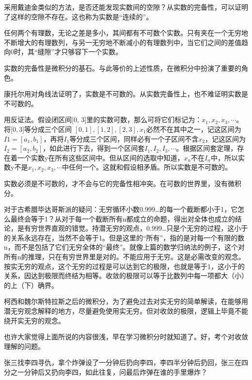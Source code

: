 \songti
\setlength{\leftskip}{0em}
采用戴迪金类似的方法，是否还能发现实数间的空隙？从实数的完备性，可以证明了这样的空隙不存在。这也称为实数是“连续的”。

任何两个有理数，无论之差是多小，其间都有不可数个实数。只有夹在一个无穷地不断增大的有理数列，与另一无穷地不断减小的有理数列中，当它们之间的差值趋向0时，其“缝隙”才只够容下一个实数。

实数的完备性是微积分的基石。与此等价的上述性质，在微积分中扮演了重要的角色。

康托尔用对角线法证明了，实数是不可数的。从实数完备性上，也不难证明实数是不可数的。

\kaishu
\setlength{\leftskip}{1em}
用反证法。假设闭区间[0, 3]里的实数可数，那么可将它们标记为：$ x_1, x_2, x_3, \cdots  $。将$ [0, 3 $]等分成三个区间 $ [0, 1], [1, 2], [2, 3], x_1 $必然不在其中之一，记这区间为$ I1 = [a_1, b_1] $，再将$ I_1 $等分成三个区间，同样必有一个子区间不含$ x_2 $，记这区间为$ I_2 = [a_2, b_2] $，如此进行下去，得到一个区间套$ I_1, I_2, I_3, \cdots $。根据区间套定理，存在着一个实数y在所有这些区间中。但从区间的选取中知道，$ x_n $不在$ I_n $中，所以实数y不是$ x_1, x_2, x_3, \cdots $中任何一个。这就和假设相矛盾。所以实数是不可数的。

\songti
\setlength{\leftskip}{0em}
实数必须是不可数的，才不会与它的完备性相冲突。在可数的世界里，没有微积分。

对于古希腊毕达哥斯派的疑问：无穷循环小数0.999…的每一个截断都小于1，它怎么最终会等于1？从对于每一个截断所有n都成立的命题，得出对全体也成立的结论，是有穷世界直观的错觉。持潜无穷的观点，0.999…只是个无穷的过程，这小于的关系永远存在，当然不会等于1。但是这里的“所有”，指的是对每一个有限的数n，而不是包括了它们无穷全体的“最终”。就像上篇的数学归纳法的例子，这个对所有n的推理，只在有穷世界里是对的。不能应用于无穷。这是必需改变的观念。按实无穷的观点，这个无穷的过程是可以达到它的极限，也就是等于1，这小于的关系，因达到极限而终结为相等。收敛的极限可以等于比数列中每一项都大（小）的上（下）确界。

柯西和魏尔斯特拉斯之后的微积分，为了避免过去对实无穷的简单解读，在能够用潜无穷观念解释的地方，尽量避免使用实无穷。但对收敛的极限，逻辑上毕竟不能绕开实无穷的观念。

也许大家觉得上面所说的内容很浅，早在学习微积分时就知道了。好，考个对收敛理解的问题。

\kaishu
\setlength{\leftskip}{1em}

张三找李四寻仇，拿个炸弹设了一分钟后扔向李四，李四半分钟后扔回，张三在四分之一分钟后又扔向李四，如此往复，问最后炸弹在谁的手里爆炸？

